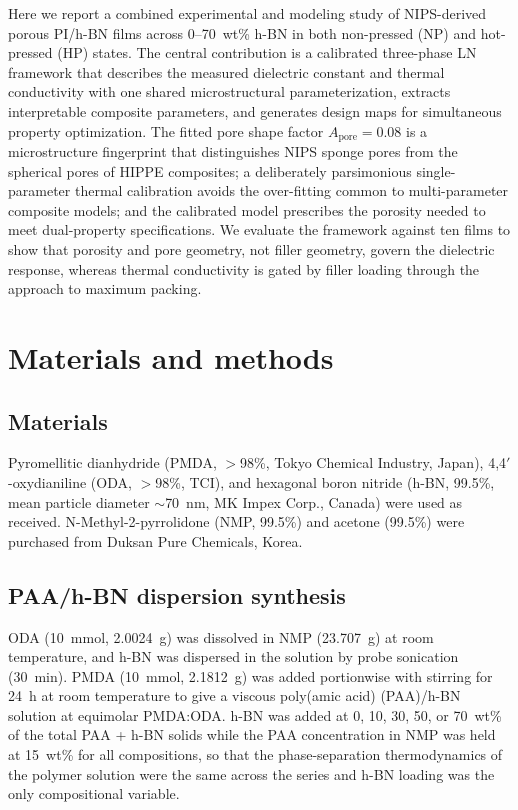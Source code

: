\documentclass[preprint,a4paper]{elsarticle}
\newcommand{\Apore}{\ensuremath{A_{\mathrm{pore}}}}
\begin{document}
Here we report a combined experimental and modeling study of NIPS-derived porous PI/h-BN films across 0--70~wt\% h-BN in both non-pressed (NP) and hot-pressed (HP) states. The central contribution is a calibrated three-phase LN framework that describes the measured dielectric constant and thermal conductivity with one shared microstructural parameterization, extracts interpretable composite parameters, and generates design maps for simultaneous property optimization. The fitted pore shape factor $\Apore = 0.08$ is a microstructure fingerprint that distinguishes NIPS sponge pores from the spherical pores of HIPPE composites; a deliberately parsimonious single-parameter thermal calibration avoids the over-fitting common to multi-parameter composite models; and the calibrated model prescribes the porosity needed to meet dual-property specifications. We evaluate the framework against ten films to show that porosity and pore geometry, not filler geometry, govern the dielectric response, whereas thermal conductivity is gated by filler loading through the approach to maximum packing.

\section{Materials and methods}
\label{sec:exp}

\subsection{Materials}
Pyromellitic dianhydride (PMDA, $>$98\%, Tokyo Chemical Industry, Japan), 4,4$'$-oxydianiline (ODA, $>$98\%, TCI), and hexagonal boron nitride (h-BN, 99.5\%, mean particle diameter $\sim$\SI{70}{\nm}, MK Impex Corp., Canada) were used as received. N-Methyl-2-pyrrolidone (NMP, 99.5\%) and acetone (99.5\%) were purchased from Duksan Pure Chemicals, Korea.

\subsection{PAA/h-BN dispersion synthesis}
\label{sec:synthesis}
ODA (\SI{10}{\milli\mole}, \SI{2.0024}{\gram}) was dissolved in NMP (\SI{23.707}{\gram}) at room temperature, and h-BN was dispersed in the solution by probe sonication (\SI{30}{\minute}). PMDA (\SI{10}{\milli\mole}, \SI{2.1812}{\gram}) was added portionwise with stirring for \SI{24}{\hour} at room temperature to give a viscous poly(amic acid) (PAA)/h-BN solution at equimolar PMDA:ODA. h-BN was added at 0, 10, 30, 50, or 70~wt\% of the total PAA + h-BN solids while the PAA concentration in NMP was held at 15~wt\% for all compositions, so that the phase-separation thermodynamics of the polymer solution were the same across the series and h-BN loading was the only compositional variable.
\end{document}
